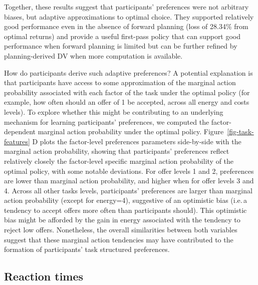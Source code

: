 \documentclass[
  letterpaper,
  DIV=11,
  numbers=noendperiod]{scrartcl}
\begin{document}
Together, these results suggest that participants' preferences were not
arbitrary biases, but adaptive approximations to optimal choice. They
supported relatively good performance even in the absence of forward
planning (loss of 28.34\% from optimal returns) and provide a useful
first-pass policy that can support good performance when forward
planning is limited but can be further refined by planning-derived DV
when more computation is available.

How do participants derive such adaptive preferences? A potential
explanation is that participants have access to some approximation of
the marginal action probability associated with each factor of the task
under the optimal policy (for example, how often should an offer of 1 be
accepted, across all energy and costs levels). To explore whether this
might be contributing to an underlying mechanism for learning
participants' preferences, we computed the factor-dependent marginal
action probability under the optimal policy.
Figure~\ref{fig-task-features} D plots the factor-level preferences
parameters side-by-side with the marginal action probability, showing
that participants' preferences reflect relatively closely the
factor-level specific marginal action probability of the optimal policy,
with some notable deviations. For offer levels 1 and 2, preferences are
lower than marginal action probability, and higher when for offer levels
3 and 4. Across all other tasks levels, participants' preferences are
larger than marginal action probability (except for energy=4),
suggestive of an optimistic bias (i.e.\,a tendency to accept offers more
often than participants should). This optimistic bias might be afforded
by the gain in energy associated with the tendency to reject low offers.
Nonetheless, the overall similarities between both variables suggest
that these marginal action tendencies may have contributed to the
formation of participants' task structured preferences.

\subsection{Reaction times}\label{reaction-times}
\end{document}

